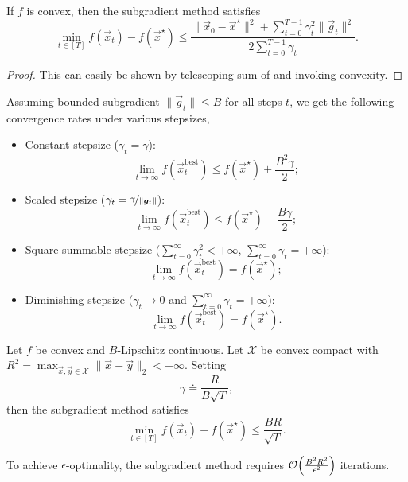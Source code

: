 \begin{theorem}
    If $f$ is convex, then the subgradient method satisfies \[
        \min_{t \in [T]} f(\vec{x}_t) - f(\vec{x}^\star) \leq \frac{\| \vec{x}_0 - \vec{x}^\star \|^2 + \sum_{t=0}^{T-1} \gamma_t^2 \| \vec{g}_t \|^2}{2 \sum_{t=0}^{T-1} \gamma_t}.
    \]
\end{theorem}

\begin{proof}
    This can easily be shown by telescoping sum of  and invoking convexity.
\end{proof}

Assuming bounded subgradient $\| \vec{g}_t \| \leq B$ for all steps $t$, we get the following
convergence rates under various stepsizes,
\begin{itemize}
    \item Constant stepsize ($\gamma_t = \gamma$): \[
              \lim_{t\to \infty} f(\vec{x}_t^{\mathrm{best}}) \leq f(\vec{x}^\star) + \frac{B^2 \gamma}{2};
          \]
    \item Scaled stepsize ($\gamma_t = \nicefrac{\gamma}{\| \vec{g}_t \|}$): \[
              \lim_{t \to \infty} f(\vec{x}_t^{\mathrm{best}}) \leq f(\vec{x}^\star) + \frac{B \gamma}{2};
          \]
    \item Square-summable stepsize ($\sum_{t=0}^{\infty} \gamma_t^2 < +\infty$, $\sum_{t=0}^{\infty} \gamma_t
              = +\infty$): \[
              \lim_{t \to \infty} f(\vec{x}_t^{\mathrm{best}}) = f(\vec{x}^\star);
          \]
    \item Diminishing stepsize ($\gamma_t \to 0$ and $\sum_{t=0}^{\infty} \gamma_t = +\infty$): \[
              \lim_{t \to \infty} f(\vec{x}_t^{\mathrm{best}}) = f(\vec{x}^\star).
          \]
\end{itemize}

\begin{corollary}
    Let $f$ be convex and $B$-Lipschitz continuous. Let $\mathcal{X}$ be convex compact with $R^2 = \max_{\vec{x},\vec{y} \in \mathcal{X}} \| \vec{x} - \vec{y} \|_2 < +\infty$. Setting \[
        \gamma \doteq \frac{R}{B \sqrt{T}},
    \]
    then the subgradient method satisfies \[
        \min_{t \in [T]} f(\vec{x}_t) - f(\vec{x}^\star) \leq \frac{BR}{\sqrt{T}}.
    \]
\end{corollary}

To achieve $\epsilon$-optimality, the subgradient method requires
$\bigo{\frac{B^2R^2}{\epsilon^2}}$ iterations.

